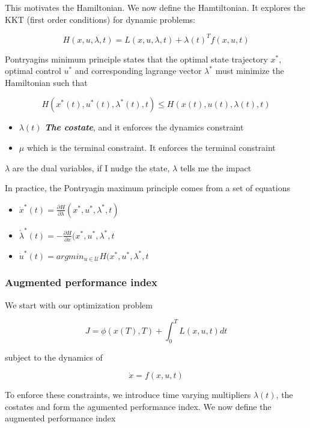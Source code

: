 \documentclass[11pt, a4paper]{article} %
\begin{document}
This motivates the Hamiltonian. We now define the Hamtiltonian. It explores the KKT (first order conditions) for dynamic problems:

\[
    H(x, u, \lambda, t) = L(x, u, \lambda, t) + \lambda \left( t \right)^T f(x, u, t)
\]

Pontryagins minimum principle states that the optimal state trajectory $ x^* $, optimal control $ u^* $ and corresponding lagrange vector $ \lambda^* $  must minimize the Hamiltonian such that

\[
    H(x^*(t), u^*(t), \lambda^*(t), t) \leq H(x(t), u(t), \lambda(t), t)
\]


\begin{itemize}
    \item $ \lambda(t)  $ \textbf{\textit{ The costate}}, and it enforces the dynamics constraint
    \item $ \mu $ which is the terminal constraint. It enforces the terminal constraint
\end{itemize}

$ \lambda $ are the dual variables, if I nudge the state, $ \lambda $ tells me the impact


In practice, the Pontryagin maximum principle comes from a set of equations

\begin{itemize}
    \item $\dot{x}^*(t) = \frac{\partial H}{\partial \lambda} (x^*, u^*, \lambda^*, t)$
    \item $\dot{\lambda}^*(t) = - \frac{\partial H}{\partial x} (x^*, u^*, \lambda^*, t$
    \item $\dot{u}^*(t) = argmin_{u\in \mathcal{U}} H(x^*, u^*, \lambda^*, t$
\end{itemize}


\subsubsection{Augmented performance index}

We start with our optimization problem

\[
    J = \phi(x(T), T) + \int_{0}^{T}L(x, u, t) dt
\]


subject to the dynamics of 

\[
    \dot{x} = f(x, u, t)
\]

To enforce these constraints, we introduce time varying multipliers $ \lambda(t) $, the costates and form the agumented performance index. We now define the augmented performance index
\end{document}
